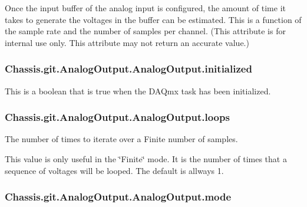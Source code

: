 Once the input buffer of the analog input is configured, the amount of time it takes to generate the voltages in the buffer can be estimated. This is a function of the sample rate and the number of samples per channel. (This attribute is for internal use only. This attribute may not return an accurate value.) \hypertarget{class_chassis_8git_1_1_analog_output_1_1_analog_output_a00be43ede9819a99e9b7d093c88278d1}{
\subsubsection[{initialized}]{\setlength{\rightskip}{0pt plus 5cm}Chassis.\-git.\-Analog\-Output.\-Analog\-Output.\-initialized}}\label{class_chassis_8git_1_1_analog_output_1_1_analog_output_a00be43ede9819a99e9b7d093c88278d1}


This is a boolean that is true when the D\-A\-Qmx task has been initialized. 

\hypertarget{class_chassis_8git_1_1_analog_output_1_1_analog_output_a25cbfcf5aff7cc620b02748d12a07f39}{
\subsubsection[{loops}]{\setlength{\rightskip}{0pt plus 5cm}Chassis.\-git.\-Analog\-Output.\-Analog\-Output.\-loops}}\label{class_chassis_8git_1_1_analog_output_1_1_analog_output_a25cbfcf5aff7cc620b02748d12a07f39}


The number of times to iterate over a Finite number of samples. 

This value is only useful in the \char`\"{}\-Finite\char`\"{} mode. It is the number of times that a sequence of voltages will be looped. The default is allways 1. \hypertarget{class_chassis_8git_1_1_analog_output_1_1_analog_output_a296d34f273903586b812eea08f6f5e1e}{
\subsubsection[{mode}]{\setlength{\rightskip}{0pt plus 5cm}Chassis.\-git.\-Analog\-Output.\-Analog\-Output.\-mode}}\label{class_chassis_8git_1_1_analog_output_1_1_analog_output_a296d34f273903586b812eea08f6f5e1e}


